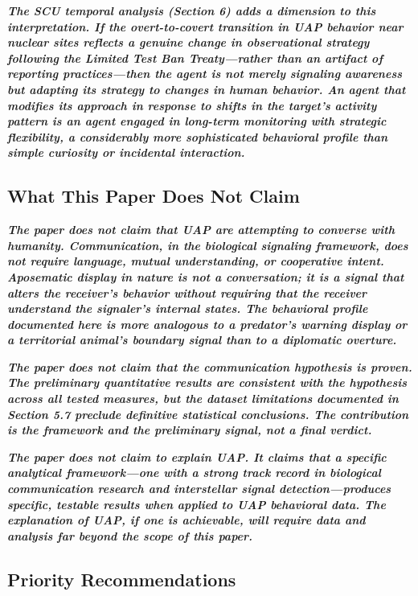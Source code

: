 \documentclass[11pt,letterpaper]{article}
\begin{document}
\textbf{\textit{The SCU temporal analysis (Section 6) adds a dimension to this interpretation. If the overt-to-covert transition in UAP behavior near nuclear sites reflects a genuine change in observational strategy following the Limited Test Ban Treaty---rather than an artifact of reporting practices---then the agent is not merely signaling awareness but adapting its strategy to changes in human behavior. An agent that modifies its approach in response to shifts in the target's activity pattern is an agent engaged in long-term monitoring with strategic flexibility, a considerably more sophisticated behavioral profile than simple curiosity or incidental interaction.}}


\subsection{What This Paper Does Not Claim}

\textbf{\textit{The paper does not claim that UAP are attempting to converse with humanity. Communication, in the biological signaling framework, does not require language, mutual understanding, or cooperative intent. Aposematic display in nature is not a conversation; it is a signal that alters the receiver's behavior without requiring that the receiver understand the signaler's internal states. The behavioral profile documented here is more analogous to a predator's warning display or a territorial animal's boundary signal than to a diplomatic overture.}}


\textbf{\textit{The paper does not claim that the communication hypothesis is proven. The preliminary quantitative results are consistent with the hypothesis across all tested measures, but the dataset limitations documented in Section 5.7 preclude definitive statistical conclusions. The contribution is the framework and the preliminary signal, not a final verdict.}}


\textbf{\textit{The paper does not claim to explain UAP. It claims that a specific analytical framework---one with a strong track record in biological communication research and interstellar signal detection---produces specific, testable results when applied to UAP behavioral data. The explanation of UAP, if one is achievable, will require data and analysis far beyond the scope of this paper.}}


\subsection{Priority Recommendations}
\end{document}

